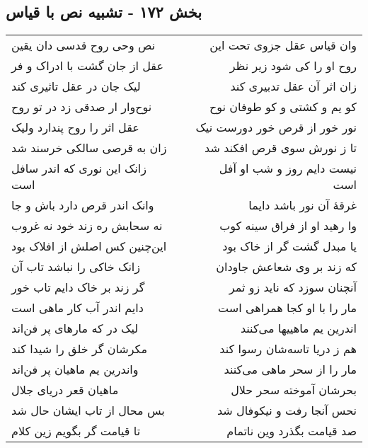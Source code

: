 \begin{center}
\section*{بخش ۱۷۲ - تشبیه نص با قیاس}
\label{sec:sh172}
\begin{longtable}{l p{0.5cm} r}
نص وحی روح قدسی دان یقین
&&
وان قیاس عقل جزوی تحت این
\\
عقل از جان گشت با ادراک و فر
&&
روح او را کی شود زیر نظر
\\
لیک جان در عقل تاثیری کند
&&
زان اثر آن عقل تدبیری کند
\\
نوح‌وار ار صدقی زد در تو روح
&&
کو یم و کشتی و کو طوفان نوح
\\
عقل اثر را روح پندارد ولیک
&&
نور خور از قرص خور دورست نیک
\\
زان به قرصی سالکی خرسند شد
&&
تا ز نورش سوی قرص افکند شد
\\
زانک این نوری که اندر سافل است
&&
نیست دایم روز و شب او آفل است
\\
وانک اندر قرص دارد باش و جا
&&
غرقهٔ آن نور باشد دایما
\\
نه سحابش ره زند خود نه غروب
&&
وا رهید او از فراق سینه کوب
\\
این‌چنین کس اصلش از افلاک بود
&&
یا مبدل گشت گر از خاک بود
\\
زانک خاکی را نباشد تاب آن
&&
که زند بر وی شعاعش جاودان
\\
گر زند بر خاک دایم تاب خور
&&
آنچنان سوزد که ناید زو ثمر
\\
دایم اندر آب کار ماهی است
&&
مار را با او کجا همراهی است
\\
لیک در که مارهای پر فن‌اند
&&
اندرین یم ماهییها می‌کنند
\\
مکرشان گر خلق را شیدا کند
&&
هم ز دریا تاسه‌شان رسوا کند
\\
واندرین یم ماهیان پر فن‌اند
&&
مار را از سحر ماهی می‌کنند
\\
ماهیان قعر دریای جلال
&&
بحرشان آموخته سحر حلال
\\
بس محال از تاب ایشان حال شد
&&
نحس آنجا رفت و نیکوفال شد
\\
تا قیامت گر بگویم زین کلام
&&
صد قیامت بگذرد وین ناتمام
\\
\end{longtable}
\end{center}
